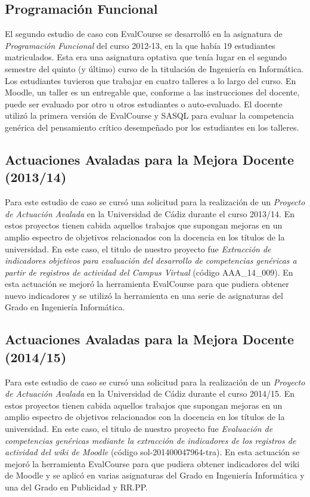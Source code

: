 	\subsection{Programación Funcional}

		El segundo estudio de caso con EvalCourse se desarrolló en la asignatura de \emph{Programación Funcional} del curso 2012-13, en la que había 19 estudiantes matriculados. Esta era una asignatura optativa que tenía lugar en el segundo semestre del quinto (y último) curso de la titulación de Ingeniería en Informática. Los estudiantes tuvieron que trabajar en cuatro talleres a lo largo del curso. En Moodle, un taller es un entregable que, conforme a las instrucciones del docente, puede ser evaluado por otro u otros estudiantes o auto-evaluado. El docente utilizó la primera versión de EvalCourse y SASQL para evaluar la competencia genérica del pensamiento crítico desempeñado por los estudiantes en los talleres.

	\subsection{Actuaciones Avaladas para la Mejora Docente (2013/14)} \label{AA1}

		Para este estudio de caso se cursó una solicitud para la realización de un \emph{Proyecto de Actuación Avalada} en la Universidad de Cádiz durante el curso 2013/14. En estos proyectos tienen cabida aquellos trabajos que supongan mejoras en un amplio espectro de objetivos relacionados con la docencia en los títulos de la universidad. En este caso, el titulo de nuestro proyecto fue \emph{Extracción de indicadores objetivos para evaluación del desarrollo de competencias genéricas a partir de registros de actividad del Campus Virtual} (código AAA\_14\_009). En esta actuación se mejoró la herramienta EvalCourse para que pudiera obtener nuevo indicadores y se utilizó la herramienta en una serie de asignaturas del Grado en Ingeniería Informática. 

	\subsection{Actuaciones Avaladas para la Mejora Docente (2014/15)} \label{AA2}

		Para este estudio de caso se cursó una solicitud para la realización de un \emph{Proyecto de Actuación Avalada} en la Universidad de Cádiz durante el curso 2014/15. En estos proyectos tienen cabida aquellos trabajos que supongan mejoras en un amplio espectro de objetivos relacionados con la docencia en los títulos de la universidad. En este caso, el titulo de nuestro proyecto fue \emph{Evaluación de competencias genéricas mediante la extracción de indicadores de los registros de actividad del wiki de Moodle} (código sol-201400047964-tra). En esta actuación se mejoró la herramienta EvalCourse para que pudiera obtener indicadores del wiki de Moodle y se aplicó en varias asignaturas del Grado en Ingeniería Informática y una del Grado en Publicidad y RR.PP. 

